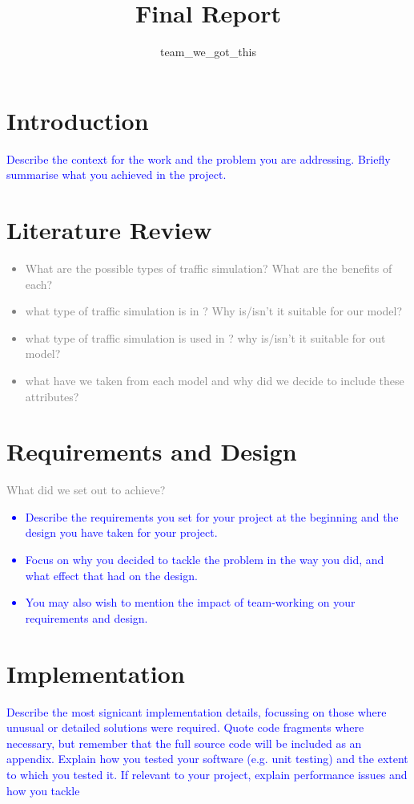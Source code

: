 \documentclass{article}
\title{Final Report}
\author{team\_we\_got\_this}
\begin{document}
\maketitle


\section*{Introduction}
	\textcolor{blue}{Describe the context for the work and the problem you are addressing. 
	Briefly summarise what you achieved in the project.}

\section{Literature Review}
	\textcolor{gray}{
		\begin{itemize}
			\item What are the possible types of traffic simulation? What are the benefits of each? 
			\item what type of traffic simulation is in \cite{namekawa2005general}? Why is/isn't it suitable for our model?
			\item what type of traffic simulation is used in \cite{sewall2010continuum}? why is/isn't it suitable for out model?
			\item what have we taken from each model and why did we decide to include these attributes?
		\end{itemize}
	}

\section{Requirements and Design}\label{RequirementsAndDesign}
	\textcolor{gray}{What did we set out to achieve?}
	\textcolor{blue}{
	\begin{itemize}
		\item Describe the requirements you set for your project at the beginning and the design you have taken for your project.
		\item  Focus on why you decided to tackle the problem in the way you did, and what effect that had on the design. 
		\item You may also wish to mention the impact of team-working on your requirements and design.
	\end{itemize}
	}

\section{Implementation}
	\textcolor{blue}{Describe the most signicant implementation details, focussing on those where unusual or detailed solutions were required. 
	Quote code fragments where necessary, but remember that the full source code will be included as an appendix. 
	Explain how you tested your software (e.g. unit testing) and the extent to which you tested it. 
	If relevant to your project, explain performance issues and how you tackle}
\end{document}
